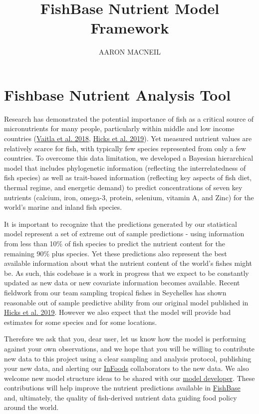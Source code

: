 \documentclass{article}
\title{FishBase Nutrient Model Framework}
\author{AARON MACNEIL}
\begin{document}
\maketitle


\section{Fishbase Nutrient Analysis Tool}

Research has demonstrated the potential importance of fish as a critical source of micronutrients for many people, particularly within middle and low income countries (\href{https://www.nature.com/articles/s41467-018-06199-w}{Vaitla et al. 2018}, \href{https://www.nature.com/articles/s41586-019-1592-6}{Hicks et al. 2019}).  Yet measured nutrient values are relatively scarce for fish, with typically few species represented from only a few countries. To overcome this data limitation, we developed a Bayesian hierarchical model that includes phylogenetic information (reflecting the interrelatedness of fish species) as well as trait-based information (reflecting key aspects of fish diet, thermal regime, and energetic demand) to predict concentrations of seven key nutrients (calcium, iron, omega-3, protein, selenium, vitamin A, and Zinc) for the world's marine and inland fish species. 

It is important to recognize that the predictions generated by our statistical model represent a set of extreme out of sample predictions - using information from less than 10\% of fish species to predict the nutrient content for the remaining 90\% plus species. Yet these predictions also represent the best available information about what the nutrient content of the world's fishes might be. As such, this codebase is a work in progress that we expect to be constantly updated as new data or new covariate information becomes available. Recent fieldwork from our team sampling tropical fishes in Seychelles has shown reasonable out of sample predictive ability from our original model published in \href{https://www.nature.com/articles/s41586-019-1592-6}{Hicks et al. 2019}. However we also expect that the model will provide bad estimates for some species and for some locations. 

Therefore we ask that you, dear user, let us know how the model is performing against your own observations, and we hope that you will be willing to contribute new data to this project using a clear sampling and analysis protocol, publishing your new data, and alerting our \href{http://www.fao.org/infoods/infoods/en/}{InFoods} collaborators to the new data. We also welcome new model structure ideas to be shared with our \href{mailto:a.macneil@dal.ca}{model developer}. These contributions will help improve the nutrient predictions available in \href{https://fishbase.ca/Nutrients/NutrientSearch.php}{FishBase} and, ultimately, the quality of fish-derived nutrient data guiding food policy around the world.
\end{document}
